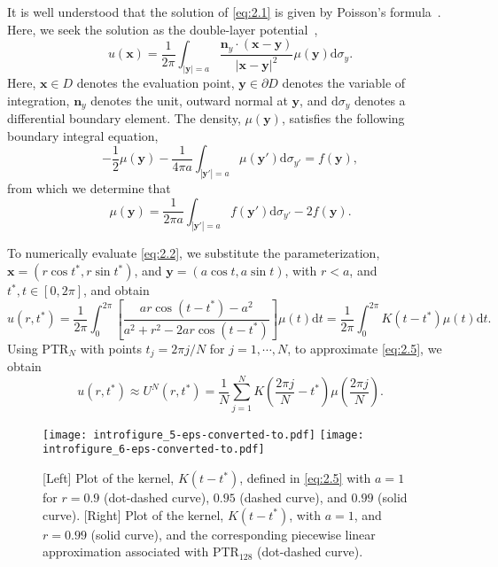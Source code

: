 \documentclass{article}[12pt]
\numberwithin{equation}{section}
\begin{document}
It is well understood that the solution of \eqref{eq:2.1} is given by
Poisson's formula~\cite{strauss1992partial}. Here, we seek the
solution as the double-layer potential~\cite{kress1999linear},
\begin{equation}
  u(\mathbf{x}) = \frac{1}{2\pi}  \int_{|\mathbf{y}| = a}
  \frac{\mathbf{n}_{y} \cdot (\mathbf{x} - \mathbf{y})}{|\mathbf{x} -
    \mathbf{y}|^{2}} \mu(\mathbf{y}) \mathrm{d}\sigma_{y}.
  \label{eq:2.2}
\end{equation} 
Here, $\mathbf{x} \in D$ denotes the evaluation point,
$\mathbf{y} \in \partial D$ denotes the variable of integration,
$\mathbf{n}_{y}$ denotes the unit, outward normal at $\mathbf{y}$, and
$\mathrm{d}\sigma_{y}$ denotes a differential boundary element. The
density, $\mu(\mathbf{y})$, satisfies the following boundary integral
equation,
\begin{equation}
  - \frac{1}{2} \mu(\mathbf{y}) - \frac{1}{4\pi a} \int_{|\mathbf{y}'
    | = a} \mu(\mathbf{y}') \mathrm{d}\sigma_{y'} = f(\mathbf{y}),
  \label{eq:2.3}
\end{equation}
from which we determine that
\begin{equation}
  \mu(\mathbf{y}) = \frac{1}{2\pi a} \int_{| \mathbf{y}' | = a}
  f(\mathbf{y}') \mathrm{d}\sigma_{y'} - 2 f(\mathbf{y}).
  \label{eq:2.4}
\end{equation}

To numerically evaluate \eqref{eq:2.2}, we substitute the
parameterization, $\mathbf{x} = (r \cos t^{\ast}, r \sin t^{\ast})$,
and $\mathbf{y} = (a \cos t, a \sin t)$, with $r < a$, and
$t^{\ast}, t \in [0,2\pi]$, and obtain
\begin{equation}
  u(r,t^{\ast}) = \frac{1}{2\pi}  \int_0^{2\pi}  
  \left[ \frac{ a r  \cos ( t - t^{\ast} ) - a^{2}}{a ^{2}+ r^2 - 2
      ar \cos( t - t^{\ast} ) } \right] \mu(t) \mathrm{d}t =
  \frac{1}{2\pi} \int_{0}^{2\pi} K(t - t^{\ast}) \mu(t) \mathrm{d}t.
  \label{eq:2.5}
\end{equation} 
Using PTR$_{N}$ with points $t_{j} = 2\pi j/N$ for
$j = 1, \cdots, N$, to approximate \eqref{eq:2.5}, we obtain
\begin{equation}
  u(r,t^{\ast}) \approx U^{N}(r,t^{\ast}) = \frac{1}{N} \sum_{j =
    1}^{N} K\left( \frac{2\pi j}{N} - t^{\ast} \right) \mu\left(
    \frac{2\pi j}{N} \right).
  \label{eq:2.6}
\end{equation}

\begin{figure}[t]
  \centering
  \texttt{[image: introfigure\_5-eps-converted-to.pdf]}
  \texttt{[image: introfigure\_6-eps-converted-to.pdf]}
  \caption{[Left] Plot of the kernel, $K(t - t^{\ast})$, defined in
    \eqref{eq:2.5} with $a = 1$ for $r = 0.9$ (dot-dashed curve),
    $0.95$ (dashed curve), and $0.99$ (solid curve). [Right] Plot of
    the kernel, $K(t - t^{\ast})$, with $a = 1$, and $r = 0.99$ (solid
    curve), and the corresponding piecewise linear approximation
    associated with PTR$_{128}$ (dot-dashed curve).}
  \label{fig:1}
\end{figure}
\end{document}
